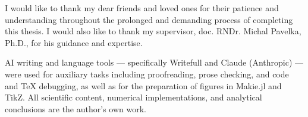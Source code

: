 \documentclass[../main.tex]{subfiles}
\begin{document}
\cleardoublepage
{}

\vspace*{-2ex}
{ \slshape

I would like to thank my dear friends and loved ones for their patience and understanding throughout the prolonged and demanding process of completing this thesis. I would also like to thank my supervisor, doc. RNDr. Michal Pavelka, Ph.D., for his guidance and expertise.

    \begin{flushright}
        \sffamily\large
        \ThesisAuthor
    \end{flushright}
}
\vspace{10cm}
AI writing and language tools — specifically Writefull and Claude (Anthropic) — were used for auxiliary tasks including proofreading, prose checking, and code and TeX debugging, as well as for the preparation of figures in Makie.jl and TikZ. All scientific content, numerical implementations, and analytical conclusions are the author's own work.



\vfill
\end{document}
